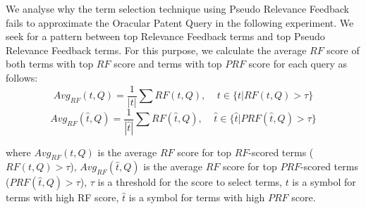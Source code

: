 We analyse why the term selection technique using Pseudo Relevance Feedback fails to approximate the Oracular Patent Query in the following experiment.  
We seek for a pattern between top Relevance Feedback terms and top Pseudo Relevance Feedback terms. For this purpose, we calculate the average $\mathit{RF}$ score of both terms with top  $\mathit{RF}$ score and terms with top $\mathit{PRF}$ score for each query as follows:
\begin{equation}
Avg_{RF}(t, Q) = \frac{1}{|t|}\sum {RF}(t, Q), \;\;\;\; t\in \{t | RF(t, Q)>\tau\}
\end{equation}
\begin{equation}
Avg_{RF}(\hat{t}, Q) = \frac{1}{|\hat{t}|}\sum {RF}(\hat{t}, Q), \;\;\;\; \hat{t}\in \{\hat{t} | PRF(\hat{t}, Q)>\tau\} 
\end{equation}

where $Avg_{RF}(t, Q)$ is the average  $\mathit{RF}$ score for top  $\mathit{RF}$-scored terms ($RF(t, Q)>\tau$), $Avg_{RF}(\hat{t}, Q)$ is the average  $\mathit{RF}$ score for top  $\mathit{PRF}$-scored terms ($PRF(\hat{t}, Q)>\tau$), $\tau$ is a threshold for the score to select terms, $t$ is a symbol for terms with high RF score, $\hat{t}$ is a symbol for terms with high $\mathit{PRF}$ score.

